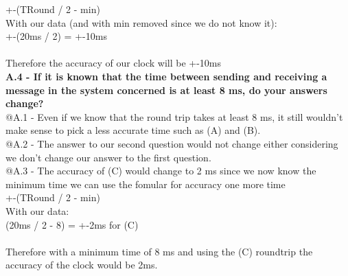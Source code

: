 +-(TRound / 2 - min)\\

With our data (and with min removed since we do not know it):\\

+-(20ms / 2) = +-10ms\\\\
Therefore the accuracy of our clock will be +-10ms\\

\textbf{A.4 - If it is known that the time between sending and receiving a message in the system concerned is at least 8 ms, do your answers change?}\\

@A.1 - Even if we know that the round trip takes at least 8 ms, it still wouldn’t make sense to pick a less accurate time such as (A) and (B).\\

@A.2 - The answer to our second question would not change either considering we don’t change our answer to the first question.\\

@A.3 - The accuracy of (C) would change to 2 ms since we now know the minimum time we can use the fomular for accuracy one more time\\

+-(TRound / 2 - min)\\

With our data:\\

(20ms / 2 - 8) = +-2ms for (C)\\\\
Therefore with a minimum time of 8 ms and using the (C) roundtrip the accuracy of the clock would be 2ms.
\newpage